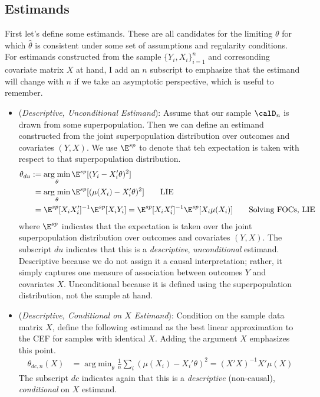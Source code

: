 \documentclass[12pt]{article}
\theoremstyle{plain}
\theoremstyle{definition}
\theoremstyle{remark}
\DeclareMathOperator*{\argmin}{arg\;min}
\begin{document}
\subsection{Estimands}
First let's define some estimands.
These are all candidates for the limiting $\theta$ for which
$\hat{\theta}$ is consistent under some set of assumptions and
regularity conditions.
For estimands constructed from the sample $\{Y_i,X_i\}_{i=1}^n$ and
corresonding covariate matrix $X$ at hand, I add an $n$ subscript to
emphasize that the estimand will change with $n$ if we take an
asymptotic perspective, which is useful to remember.
\begin{itemize}
  \item (\emph{Descriptive, Unconditional Estimand}):
    Assume that our sample $\calD_n$ is drawn from some superpopulation.
    Then we can define an estimand constructed from the joint
    superpopulation distribution over outcomes and covariates
    $(Y,X)$.
    We use $\E^{sp}$ to denote that teh expectation is taken with
    respect to that superpopulation distribution.
    \begin{align*}
      \theta_{du}
      &:=
      \argmin_{\theta}
      \E^{sp}[(Y_i-X_i'\theta)^2]
      \\
      &\hphantom{:}=
      \argmin_{\theta}
      \E^{sp}[(\mu(X_i)-X_i'\theta)^2]
      \qquad
      \text{LIE}
      \\
      &\hphantom{:}=
      \E^{sp}[X_iX_i']^{-1}
      \E^{sp}[X_iY_i]
      =
      \E^{sp}[X_iX_i']^{-1}
      \E^{sp}[X_i\mu(X_i)]
      \qquad
      \text{Solving FOCs, LIE}
    \end{align*}
    where $\E^{sp}$ indicates that the expectation is taken over the
    joint superpopulation distribution over outcomes and covariates
    $(Y,X)$.
    The subscript $du$ indicates that this is a \emph{descriptive},
    \emph{unconditional} estimand.
    Descriptive because we do not assign it a causal interpretation;
    rather, it simply captures one measure of association between
    outcomes $Y$ and covariates $X$.
    Unconditional because it is defined using the superpopulation
    distribution, not the sample at hand.


  \item
    (\emph{Descriptive, Conditional on $X$ Estimand}):
    Condition on the sample data matrix $X$, define the following
    estimand as the best linear approximation to the CEF for samples
    with identical $X$.
    Adding the argument $X$ emphasizes this point.
    \begin{align*}
      \theta_{dc,n}(X)
      &=
      \argmin_{\theta}
      \frac{1}{n}
      \sum_i
      (\mu(X_i)-X_i'\theta)^2
      =
      (X'X)^{-1}X'\mu(X)
    \end{align*}
    The subscript $dc$ indicates again that this is a \emph{descriptive}
    (non-causal), \emph{conditional} on $X$ estimand.



\end{itemize}
\end{document}
